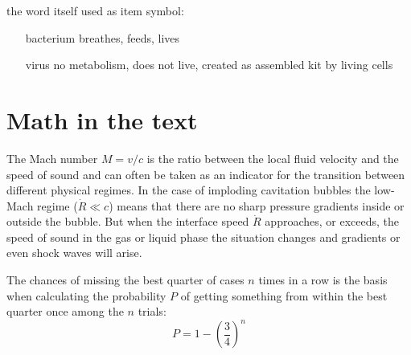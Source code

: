 \documentclass[11pt,a4paper,twoside,titlepage]{book}
\begin{document}
the word itself used as item symbol:
\begin{itemize}
\item[bacterium] breathes, feeds, lives
\item[virus] no metabolism, does not live, created as assembled kit by living cells
\end{itemize}


\chapter{Math in the text}%

The Mach number $M=v/c$ is the ratio between the local fluid velocity and the speed of sound and can often be taken as an indicator for the transition between different physical regimes. In the case of imploding cavitation bubbles the low-Mach regime ($\dot{R}\ll c$) means that there are no sharp pressure gradients inside or outside the bubble. But when the interface speed $\dot{R}$ approaches, or exceeds, the speed of sound in the gas or liquid phase the situation changes and gradients or even shock waves will arise.

The chances of missing the best quarter of cases $n$ times in a row is the basis when calculating the probability $P$ of getting something from within the best quarter once among the $n$ trials:
\begin{equation}
P=1-\left( \frac{3}{4} \right)^n
\end{equation}

\end{document}
